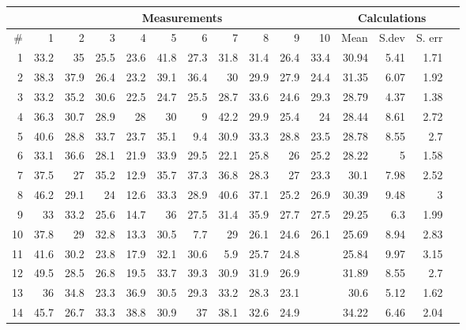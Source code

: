 \documentclass[12pt,a4paper,oneside]{article}
\begin{document}

\newpage
{}
\setcounter{page}{1}
\begin{tabular}{ | r | r | r | r | r | r | r | r | r | r | r | r | r | r | r | }
    \hline
    & \multicolumn{10}{|c|}{Measurements} & \multicolumn{3}{|c|}{Calculations} \\ \hline
    \# & 1 & 2 & 3 & 4 & 5 & 6 & 7 & 8 & 9 & 10 & Mean & S.dev & S. err \\ \hline
    1 & 33.2 & 35 & 25.5 & 23.6 & 41.8 & 27.3 & 31.8 & 31.4 & 26.4 & 33.4 & 30.94 & 5.41 & 1.71 \\ \hline
    2 & 38.3 & 37.9 & 26.4 & 23.2 & 39.1 & 36.4 & 30 & 29.9 & 27.9 & 24.4 & 31.35 & 6.07 & 1.92 \\ \hline
    3 & 33.2 & 35.2 & 30.6 & 22.5 & 24.7 & 25.5 & 28.7 & 33.6 & 24.6 & 29.3 & 28.79 & 4.37 & 1.38 \\ \hline
    4 & 36.3 & 30.7 & 28.9 & 28 & 30 & 9 & 42.2 & 29.9 & 25.4 & 24 & 28.44 & 8.61& 2.72 \\ \hline
    5 & 40.6 & 28.8 & 33.7 & 23.7 & 35.1 & 9.4 & 30.9 & 33.3 & 28.8 & 23.5 & 28.78 & 8.55& 2.7 \\ \hline
    6 & 33.1 & 36.6 & 28.1 & 21.9 & 33.9 & 29.5 & 22.1 & 25.8 & 26 & 25.2 & 28.22 & 5 & 1.58 \\ \hline
    7 & 37.5 & 27 & 35.2 & 12.9 & 35.7 & 37.3 & 36.8 & 28.3 & 27 & 23.3 & 30.1 & 7.98 & 2.52 \\ \hline
    8 & 46.2 & 29.1 & 24 & 12.6 & 33.3 & 28.9 & 40.6 & 37.1 & 25.2 & 26.9 & 30.39 & 9.48 & 3 \\ \hline
    9 & 33 & 33.2 & 25.6 & 14.7 & 36 & 27.5 & 31.4 & 35.9 & 27.7 & 27.5 & 29.25 & 6.3 & 1.99 \\ \hline
    10 & 37.8 & 29 & 32.8 & 13.3 & 30.5 & 7.7 & 29 & 26.1 & 24.6 & 26.1 & 25.69 & 8.94 & 2.83 \\ \hline
    11 & 41.6 & 30.2 & 23.8 & 17.9 & 32.1 & 30.6 & 5.9 & 25.7 & 24.8 &  & 25.84 & 9.97 & 3.15 \\ \hline
    12 & 49.5 & 28.5 & 26.8 & 19.5 & 33.7 & 39.3 & 30.9 & 31.9 & 26.9 &  & 31.89 & 8.55 & 2.7 \\ \hline
    13 & 36 & 34.8 & 23.3 & 36.9 & 30.5 & 29.3 & 33.2 & 28.3 & 23.1 &  & 30.6 & 5.12 & 1.62 \\ \hline
    14 & 45.7 & 26.7 & 33.3 & 38.8 & 30.9 & 37 & 38.1 & 32.6 & 24.9 &  & 34.22 & 6.46 & 2.04 \\ \hline
\end{tabular}
\end{document}

